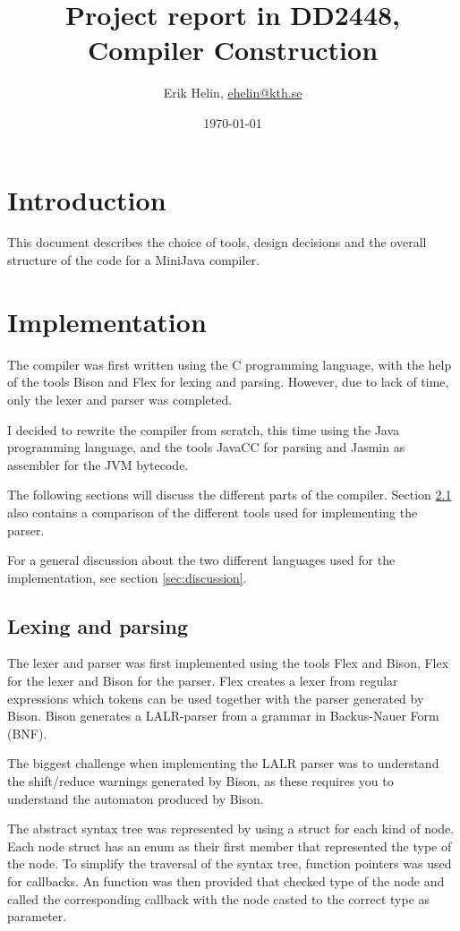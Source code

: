 \documentclass[11pt,oneside,a4paper]{article}
\begin{document}
\title{Project report in DD2448, Compiler Construction}
\author{Erik Helin, \href{mailto:ehelin@kth.se}{ehelin@kth.se}}
\date{\today}
\maketitle

\tableofcontents

\section{Introduction}
This document describes the choice of tools, design decisions and the overall 
structure of the code for a MiniJava compiler.
\section{Implementation}
The compiler was first written using the C programming language, with the help
of the tools Bison and Flex for lexing and parsing. However, due to lack of
time, only the lexer and parser was completed. 

I decided to rewrite the compiler from scratch, this time using the Java
programming language, and the tools JavaCC for parsing and Jasmin as assembler
for the JVM bytecode.

The following sections will discuss the different parts of the compiler.
Section \ref{sec:lexing_and_parsing} also contains a comparison of the
different tools used for implementing the parser.

For a general discussion about the two different languages used for the
implementation, see section \ref{sec:discussion}.
\subsection{Lexing and parsing}
\label{sec:lexing_and_parsing}
The lexer and parser was first implemented using the tools Flex and Bison, Flex
for the lexer and Bison for the parser. Flex creates a lexer from regular
expressions which tokens can be used together with the parser generated by
Bison. Bison generates a LALR-parser from a grammar in Backus-Nauer Form (BNF). 

The biggest challenge when implementing the LALR parser was to understand
the shift/reduce warnings generated by Bison, as these requires you to
understand the automaton produced by Bison.

The abstract syntax tree was represented by using a struct for each kind of
node. Each node struct has an enum as their first member that represented 
the type of the node. To simplify the traversal of the syntax tree, 
function pointers was used for callbacks. An function was then provided that 
checked type of the node and called the corresponding callback with the node
casted to the correct type as parameter.
\end{document}
